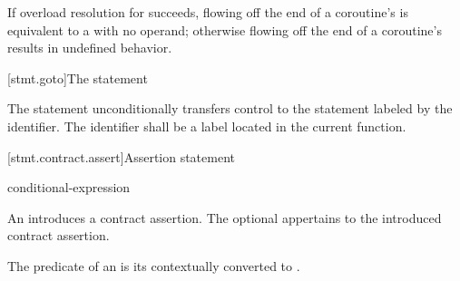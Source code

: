 \pnum
If overload resolution for  succeeds,
flowing off the end of a coroutine's 
is equivalent to a  with no operand;
otherwise flowing off the end of a coroutine's 
results in undefined behavior.
%
%
%
%
%

[stmt.goto]{The  statement}%

\pnum
The  statement unconditionally transfers control to the
statement labeled by the identifier. The identifier shall be a
%
label located in the current function.

[stmt.contract.assert]{Assertion statement}

\begin{bnf}
\br
      \terminal{(} conditional-expression \terminal{)} \terminal{;}
\end{bnf}

\pnum
{}
An 
introduces a contract assertion.
The optional 
appertains to the introduced contract assertion.

\pnum
The predicate
of an 
is its 
contextually converted to .

